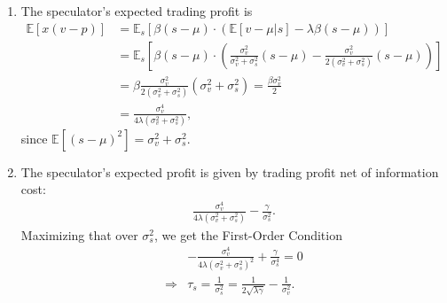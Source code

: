 \documentclass[a4paper]{article}
\begin{document}
\begin{enumerate}
	\item The speculator's expected trading profit is
	\begin{align*}
		\mathbb{E} [x(v-p) ] 
		&= \mathbb{E}_s \left[ \beta (s-\mu) \cdot \left( \mathbb{E}[v - \mu|s] - \lambda \beta (s-\mu) \right) \right]
		\\
		&= \mathbb{E}_s \left[ \beta (s-\mu) \cdot \left( \frac{\sigma^2_v}{\sigma^2_v + \sigma^2_s} (s-\mu) - \frac{\sigma^2_v}{2 (\sigma^2_v + \sigma^2_s) } (s-\mu) \right) \right]
		\\
		&= \beta \frac{\sigma^2_v}{2(\sigma^2_v + \sigma^2_s)} (\sigma^2_v + \sigma^2_s)
		= \frac{\beta \sigma^2_v}{2}
		\\
		&= \frac{\sigma^4_v}{4 \lambda (\sigma^2_v + \sigma^2_s)},
	\end{align*}
	since $\mathbb{E}[(s-\mu)^2] = \sigma^2_v + \sigma^2_s$.
	
	\item The speculator's expected profit is given by trading profit net of information cost:
	\begin{align*}
		\frac{\sigma^4_v}{4 \lambda (\sigma^2_v + \sigma^2_s)} - \frac{\gamma}{\sigma^2_s}.
	\end{align*}
	Maximizing that over $\sigma^2_s$, we get the First-Order Condition
	\begin{align*}
		&-\frac{\sigma^4_v}{4 \lambda (\sigma^2_v + \sigma^2_s)^{2}} + \frac{\gamma}{\sigma^4_s} = 0
		\\ \Rightarrow 
		&\tau_s = \frac{1}{\sigma^2_s} = \frac{1}{2\sqrt{\lambda \gamma}} - \frac{1}{\sigma^2_v}.
	\end{align*}
	

\end{enumerate}
\end{document}
